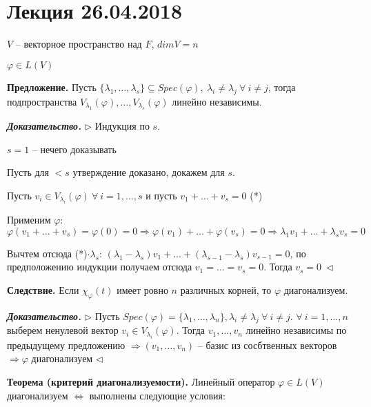 \section{Лекция 26.04.2018}

$V$ -- векторное пространство над $F$, $dimV = n$

$\varphi \in L(V)$

\vspace{\baselineskip}
\textbf{Предложение.} Пусть $\{\lambda_1, \dots, \lambda_s\} \subseteq Spec(\varphi), \ \lambda_i \neq \lambda_j \ \forall \ i \neq j$, тогда подпространства $V_{\lambda_1} (\varphi), \dots, V_{\lambda_s} (\varphi)$ линейно независимы.

\vspace{\baselineskip}
\textbf{\textit{Доказательство.}} $\rhd$ Индукция по $s$.

$s = 1$ -- нечего доказывать

Пусть для $< s$ утверждение доказано, докажем для $s$.

Пусть $v_i \in V_{\lambda_i} (\varphi) \ \forall \ i = 1, \dots, s$ и пусть $v_1 + \dots + v_s = 0$ (*)

Применим $\varphi$: $\varphi(v_1 + \dots + v_s) = \varphi(0) = 0 \Rightarrow \varphi(v_1) + \dots + \varphi(v_s) = 0 \Rightarrow \lambda_1 v_1 + \dots + \lambda_s v_s = 0$

Вычтем отсюда (*)$\cdot \lambda_s$: $(\lambda_1 - \lambda_s) v_1 + \dots + (\lambda_{s-1} - \lambda_s) v_{s - 1} = 0$, по предположению индукции получаем отсюда $v_1 = \dots = v_s = 0$. Тогда $v_s = 0 \ \lhd$ 

\vspace{\baselineskip}
\textbf{Следствие.} Если $\chi_{\varphi}(t)$ имеет ровно $n$ различных корней, то $\varphi$ диагонализуем.

\vspace{\baselineskip}
\textbf{\textit{Доказательство.}} $\rhd$ Пусть $Spec (\varphi) = \{\lambda_1, \dots, \lambda_n\}, \lambda_i \neq \lambda_j \ \forall \ i \neq j$. $\forall \ i = 1, \dots, n$ выберем ненулевой вектор $v_i \in V_{\lambda_i} (\varphi)$. Тогда $v_1, \dots, v_n$ линейно независимы по предыдущему предложению $\Rightarrow (v_1, \dots, v_n)$ -- базис из сосбтвенных векторов $\Rightarrow \varphi$ диагонализуем $\lhd$

\vspace{\baselineskip}
\textbf{Теорема (критерий диагонализуемости).} Линейный оператор $\varphi \in L(V)$ диагонализуем $\Leftrightarrow$ выполнены следующие условия:

